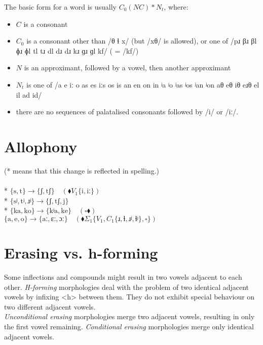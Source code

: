 \documentclass{book}
\begin{document}
The basic form for a word is usually $C_0(NC)*N_t$, where:

\begin{itemize}
  \item $C$ is a consonant
  \item $C_0$ is a consonant other than /θ ɬ x/ (but /xθ/ is allowed), or one of /pɹ βɹ βl ɸɹ ɸl tl tɹ dl dɹ dɹ kɹ ɡɹ ɡl kf/ ( = /kf/)
  \item $N$ is an approximant, followed by a vowel, then another approximant
  \item $N_t$ is one of /a e iː o as es iːs os is an en on in ʲa ʲo ʲas ʲos ʲan ʲon aθ eθ iθ eɹθ el il ad id/
  \item there are no sequences of palatalised consonants followed by /i/ or /iː/.
\end{itemize}

\section{Allophony}

(* means that this change is reflected in spelling.) \\
~\\
* $\{\text{s}, \text{t}\} \rightarrow \{\text{ʃ}, \text{tʃ}\} \quad(\blacklozenge V_1\{\text{i}, \text{iː}\})$ \\
* $\{\text{sʲ}, \text{tʲ}, \text{ɹʲ}\} \rightarrow \{\text{ʃ}, \text{tʃ}, \text{j}\}$ \\
* $\{\text{ka}, \text{ko}\} \rightarrow \{\text{kʲa}, \text{ke}\} \quad(\square \blacklozenge)$ \\
$\{\text{a}, \text{e}, \text{o}\} \rightarrow \{\text{aː}, \text{ɛː}, \text{ɔː}\} \quad(\blacklozenge \Sigma_1\{V_1, C_1\{\text{ɹ}, \text{ɬ}, \text{ɹʲ}, \text{ɬʲ}\}, \square\})$

\section{Erasing vs. h-forming}

Some inflections and compounds might result in two vowels adjacent to each other. \emph{H-forming} morphologies deal with the problem of two identical adjacent vowels by infixing <h> between them. They do not exhibit special behaviour on two different adjacent vowels. \\
\emph{Unconditional erasing} morphologies merge two adjacent vowels, resulting in only the first vowel remaining. \emph{Conditional erasing} morphologies merge only identical adjacent vowels.
\end{document}
